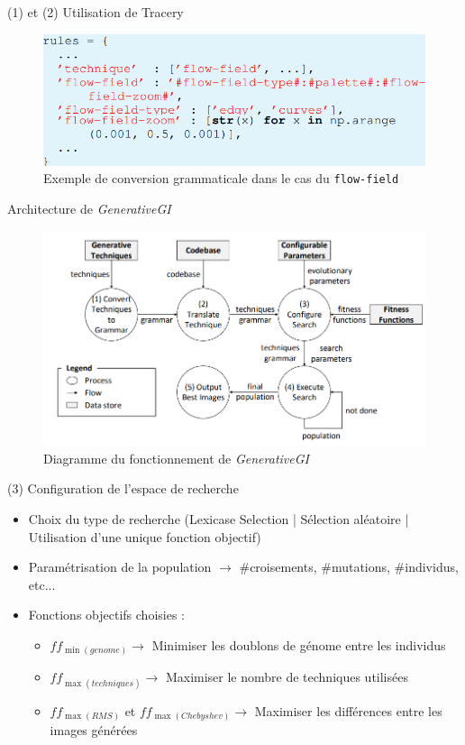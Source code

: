 \documentclass[aspectratio=169]{beamer}
\begin{document}
\begin{frame}{(1) et (2) Utilisation de Tracery}
    \begin{figure}
        \centering
        \includegraphics[scale=0.4]{fig/grammar.png}
        \caption{Exemple de conversion grammaticale dans le cas du \texttt{flow-field}}
    \end{figure}
\end{frame}

\begin{frame}{Architecture de \textit{GenerativeGI}}
    \begin{figure}
        \centering
        \includegraphics[scale=0.4]{fig/archi.png}
        \caption{Diagramme du fonctionnement de \textit{GenerativeGI}}
    \end{figure}
\end{frame}

\begin{frame}{(3) Configuration de l'espace de recherche}
    \begin{itemize}
        \item Choix du type de recherche (Lexicase Selection | Sélection aléatoire | Utilisation d'une unique fonction objectif)
        \item Paramétrisation de la population $\rightarrow$ \#croisements, \#mutations, \#individus, etc...
        \item Fonctions objectifs choisies :
        \begin{itemize}
            \item $ff_{\min(genome)} \rightarrow$ Minimiser les doublons de génome entre les individus 
            \item $ff_{\max(techniques)} \rightarrow$ Maximiser le nombre de techniques utilisées
            \item $ff_{\max(RMS)}$ et $ff_{\max(Chebyshev)} \rightarrow$ Maximiser les différences entre les images générées
        \end{itemize}
    \end{itemize}
\end{frame}
\end{document}
